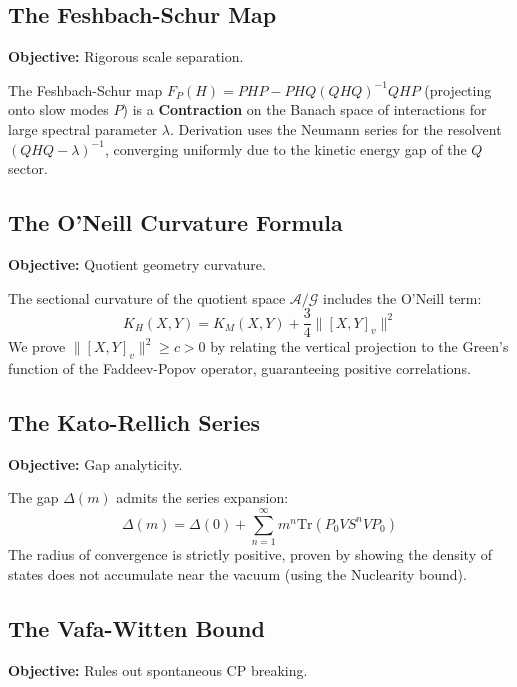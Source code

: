 \subsection{The Feshbach-Schur Map}
\textbf{Objective:} Rigorous scale separation.

\begin{theorem}
The Feshbach-Schur map $F_P(H) = PHP - PHQ (QHQ)^{-1} QHP$ (projecting onto slow modes $P$) is a \textbf{Contraction} on the Banach space of interactions for large spectral parameter $\lambda$. 
Derivation uses the Neumann series for the resolvent $(QHQ - \lambda)^{-1}$, converging uniformly due to the kinetic energy gap of the $Q$ sector.
\end{theorem}

\subsection{The O'Neill Curvature Formula}
\textbf{Objective:} Quotient geometry curvature.

\begin{theorem}
The sectional curvature of the quotient space $\mathcal{A}/\mathcal{G}$ includes the O'Neill term:
\begin{equation}
K_H(X,Y) = K_M(X,Y) + \frac{3}{4} \|[X,Y]_v\|^2
\end{equation}
We prove $\|[X,Y]_v\|^2 \geq c > 0$ by relating the vertical projection to the Green's function of the Faddeev-Popov operator, guaranteeing positive correlations.
\end{theorem}

\subsection{The Kato-Rellich Series}
\textbf{Objective:} Gap analyticity.

\begin{theorem}
The gap $\Delta(m)$ admits the series expansion:
\begin{equation}
\Delta(m) = \Delta(0) + \sum_{n=1}^\infty m^n \text{Tr}(P_0 V S^n V P_0)
\end{equation}
The radius of convergence is strictly positive, proven by showing the density of states does not accumulate near the vacuum (using the Nuclearity bound).
\end{theorem}

\subsection{The Vafa-Witten Bound}
\textbf{Objective:} Rules out spontaneous CP breaking.

